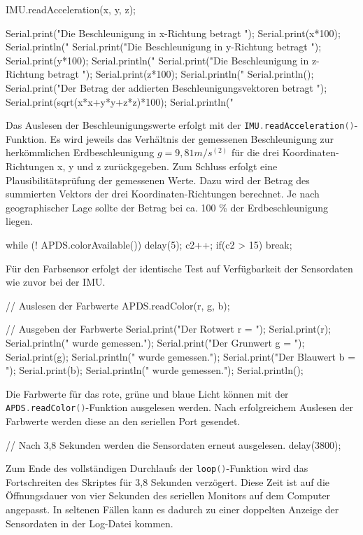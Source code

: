 	\begin{Arduino}
		IMU.readAcceleration(x, y, z);
		
		Serial.print("Die Beschleunigung in x-Richtung betragt ");
		Serial.print(x*100);
		Serial.println(" %
		Serial.print("Die Beschleunigung in y-Richtung betragt ");
		Serial.print(y*100);
		Serial.println(" %
		Serial.print("Die Beschleunigung in z-Richtung betragt ");
		Serial.print(z*100);
		Serial.println(" %
		Serial.println();
		Serial.print("Der Betrag der addierten Beschleunigungsvektoren betragt ");
		Serial.print(sqrt(x*x+y*y+z*z)*100);
		Serial.println(" %
	\end{Arduino}
	
	Das Auslesen der Beschleunigungswerte erfolgt mit der \lstinline[language=C++]|IMU.readAcceleration()|-Funktion. Es wird jeweils das Verhältnis der gemessenen Beschleunigung zur herkömmlichen Erdbeschleunigung $g = 9,81 m/s^(2)$ für die drei Koordinaten-Richtungen x, y und z zurückgegeben. Zum Schluss erfolgt eine Plausibilitätsprüfung der gemessenen Werte. Dazu wird der Betrag des summierten Vektors der drei Koordinaten-Richtungen berechnet. Je nach geographischer Lage sollte der Betrag bei ca. 100 \% der Erdbeschleunigung liegen.
	
	\begin{Arduino}
		while (! APDS.colorAvailable()) {
			delay(5);
			c2++;
			if(c2 > 15)
			{
				break;
			}
		}
	\end{Arduino}
	
	Für den Farbsensor erfolgt der identische Test auf Verfügbarkeit der Sensordaten wie zuvor bei der IMU. 
	
	\begin{Arduino}
		// Auslesen der Farbwerte
		APDS.readColor(r, g, b);
		
		// Ausgeben der Farbwerte
		Serial.print("Der Rotwert r = ");
		Serial.print(r);
		Serial.println(" wurde gemessen.");
		Serial.print("Der Grunwert g = ");
		Serial.print(g);
		Serial.println(" wurde gemessen.");
		Serial.print("Der Blauwert b = ");
		Serial.print(b);
		Serial.println(" wurde gemessen.");
		Serial.println();
	\end{Arduino}
	
	Die Farbwerte für das rote, grüne und blaue Licht können mit der \lstinline[language=C++]|APDS.readColor()|-Funktion ausgelesen werden. Nach erfolgreichem Auslesen der Farbwerte werden diese an den seriellen Port gesendet.
	
	\begin{Arduino}
		// Nach 3,8 Sekunden werden die Sensordaten erneut ausgelesen.
		delay(3800);
	\end{Arduino}
	 
	 Zum Ende des vollständigen Durchlaufs der \lstinline[language=C++]|loop()|-Funktion wird das Fortschreiten des Skriptes für 3,8 Sekunden verzögert. Diese Zeit ist auf die Öffnungsdauer von vier Sekunden des seriellen Monitors auf dem Computer angepasst. In seltenen Fällen kann es dadurch zu einer doppelten Anzeige der Sensordaten in der Log-Datei kommen.


    
